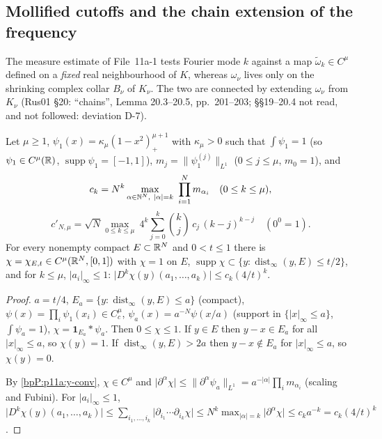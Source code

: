 \subsection{Mollified cutoffs and the chain extension of the frequency}\label{bpP:p11a:sec-chain}

The measure estimate of File~11a-1 tests Fourier mode $k$ against a map $\tilde\omega_k\in C^\mu$ defined on a \emph{fixed} real neighbourhood of $K$, whereas $\omega_\nu$ lives only on the shrinking complex collar $B_\nu$ of $K_\nu$. The two are connected by extending $\omega_\nu$ from $K_\nu$ (Rus01 \S20: ``chains'', Lemma 20.3--20.5, pp.~201--203; \S\S19--20.4 not read, and not followed: deviation D-7).

\begin{lemma}\label{bpP:p11a:smooth-cutoff}
Let $\mu\ge1$, $\psi_1(x)=\kappa_\mu(1-x^2)_+^{\mu+1}$ with $\kappa_\mu>0$ such that $\int\psi_1=1$ (so $\psi_1\in C^\mu(\mathbb{R})$, $\operatorname{supp}\psi_1=[-1,1]$), $m_j=\lVert\psi_1^{(j)}\rVert_{L^1}$ ($0\le j\le\mu$, $m_0=1$), and
\[c_k=N^k\max_{\alpha\in\N^N,\ \lvert\alpha\rvert=k}\ \prod_{i=1}^Nm_{\alpha_i}\quad(0\le k\le\mu),\]
\[c'_{N,\mu}=\sqrt N\max_{0\le k\le\mu}\ 4^k\sum_{j=0}^k\binom kj\,c_j\,(k-j)^{k-j}\quad(0^0=1).\]
For every nonempty compact $E\subset\mathbb{R}^N$ and $0<t\le1$ there is $\chi=\chi_{E,t}\in C^\mu(\mathbb{R}^N,[0,1])$ with $\chi=1$ on $E$, $\operatorname{supp}\chi\subset\{y:\operatorname{dist}_\infty(y,E)\le t/2\}$, and for $k\le\mu$, $\lvert a_i\rvert_\infty\le1$: $\lvert D^k\chi(y)(a_1,\dots,a_k)\rvert\le c_k(4/t)^k$.
\end{lemma}
\begin{proof}
\label{stepP:p11a:sc-constr} $a=t/4$, $E_a=\{y:\operatorname{dist}_\infty(y,E)\le a\}$ (compact), $\psi(x)=\prod_i\psi_1(x_i)\in C^\mu_c$, $\psi_a(x)=a^{-N}\psi(x/a)$ (support in $\{\lvert x\rvert_\infty\le a\}$, $\int\psi_a=1$), $\chi=\mathbf 1_{E_a}*\psi_a$. Then $0\le\chi\le1$. If $y\in E$ then $y-x\in E_a$ for all $\lvert x\rvert_\infty\le a$, so $\chi(y)=1$. If $\operatorname{dist}_\infty(y,E)>2a$ then $y-x\notin E_a$ for $\lvert x\rvert_\infty\le a$, so $\chi(y)=0$.

\label{stepP:p11a:sc-deriv} By \ref{bpP:p11a:y-conv}, $\chi\in C^\mu$ and $\lvert\partial^\alpha\chi\rvert\le\lVert\partial^\alpha\psi_a\rVert_{L^1}=a^{-\lvert\alpha\rvert}\prod_im_{\alpha_i}$ (scaling and Fubini). For $\lvert a_i\rvert_\infty\le1$, $\lvert D^k\chi(y)(a_1,\dots,a_k)\rvert\le\sum_{i_1,\dots,i_k}\lvert\partial_{i_1}\cdots\partial_{i_k}\chi\rvert\le N^k\max_{\lvert\alpha\rvert=k}\lvert\partial^\alpha\chi\rvert\le c_ka^{-k}=c_k(4/t)^k$.
\end{proof}

